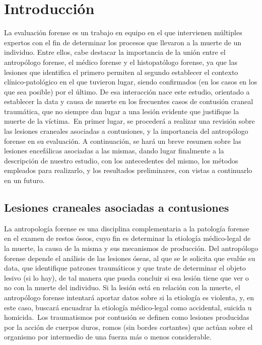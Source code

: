 \chapter{Introducción}
La evaluación forense es un trabajo en equipo en el que intervienen múltiples expertos con el fin de determinar los procesos que llevaron a la muerte de un individuo. Entre ellos, cabe destacar la importancia de la unión entre el antropólogo forense, el médico forense y el histopatólogo forense, ya que las lesiones que identifica el primero permiten al segundo establecer el contexto clínico-patológico en el que tuvieron lugar, siendo confirmados (en los casos en los que sea posible) por el último. De esa interacción nace este estudio, orientado a establecer la data y causa de muerte en los frecuentes casos de contusión craneal traumática, que no siempre dan lugar a una lesión evidente que justifique la muerte de la víctima.\ 
En primer lugar, se procederá a realizar una revisión sobre las lesiones craneales asociadas a contusiones, y la importancia del antropólogo forense en su evaluación. A continuación, se hará un breve resumen sobre las lesiones encefálicas asociadas a las mismas, dando lugar finalmente a la descripción de nuestro estudio, con los antecedentes del mismo, los métodos empleados para realizarlo, y los resultados preliminares, con vistas a continuarlo en un futuro.\ 

\section{Lesiones craneales asociadas a contusiones}
La antropología forense es una disciplina complementaria a la patología forense en el examen de restos óseos, cuyo fin es determinar la etiología médico-legal de la muerte, la causa de la misma y sus mecanismos de producción. Del antropólogo forense depende el análisis de las lesiones óseas, al que se le solicita que evalúe su data, que identifique patrones traumáticos y que trate de determinar el objeto lesivo (si lo hay), de tal manera que pueda concluir si esa lesión tiene que ver o no con la muerte del individuo. Si la lesión está en relación con la muerte, el antropólogo forense intentará aportar datos sobre si la etiología es violenta, y, en este caso, buscará encuadrar la etiología médico-legal como accidental, suicida u homicida.\ 
Los traumatismos por contusión se definen como lesiones producidas por la acción de cuerpos duros, romos (sin bordes cortantes) que actúan sobre el organismo por intermedio de una fuerza más o menos considerable.\
